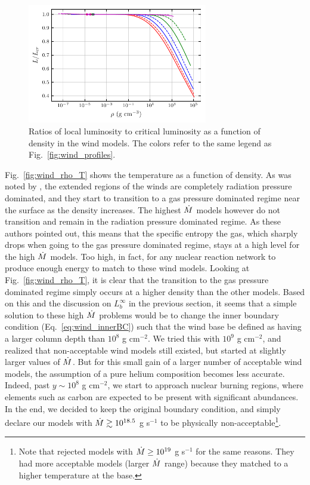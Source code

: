 \documentclass[../main.tex]{subfiles}
\begin{document}
\begin{figure}[htb!]
    \centering
    \includegraphics[width=0.7\textwidth]{figures/wind_L_Lcrit.pdf}
    \caption[Wind local to critical luminosity ratios]{Ratios of local luminosity to critical luminosity as a function of density in the wind models. The colors refer to the same legend as Fig.~\ref{fig:wind_profiles}.}
    \label{fig:wind_L_Lcrit}
\end{figure}

Fig.~\ref{fig:wind_rho_T} shows the temperature as a function of density. As was noted by \citet{Paczynski1986b}, the extended regions of the winds are completely radiation pressure dominated, and they start to transition to a gas pressure dominated regime near the surface as the density increases. The highest $\dot{M}$ models however do not transition and remain in the radiation pressure dominated regime. As these authors pointed out, this means that the specific entropy the gas, which sharply drops when going to the gas pressure dominated regime, stays at a high level for the high $\dot{M}$ models. Too high, in fact, for any nuclear reaction network to produce enough energy to match to these wind models. Looking at Fig.~\ref{fig:wind_rho_T}, it is clear that the transition to the gas pressure dominated regime simply occurs at a higher density than the other models. Based on this and the discussion on $L
_b^\infty$ in the previous section, it seems that a simple solution to these high $\dot{M}$ problems would be to change the inner boundary condition (Eq.~\ref{eq:wind_innerBC}) such that the wind base be defined as having a larger column depth than $10^8$ g cm$^{-2}$. We tried this with $10^9$ g cm$^{-2}$, and realized that non-acceptable wind models still existed, but started at slightly larger values of $\dot{M}$. But for this small gain of a larger number of acceptable wind models, the assumption of a pure helium composition becomes less accurate. Indeed, past $y\sim 10
^8$ g cm$^{-2}$, we start to approach nuclear burning regions, where elements such as carbon are expected to be present with significant abundances.  In the end, we decided to keep the original boundary condition, and simply declare our models with $\dot{M}\gtrsim 10^{18.5}$ g s$^{-1}$ to be physically non-acceptable\footnote{Note that \citet{Paczynski1986b} rejected models with $\dot{M}\geq 10^{19}$ g s$^{-1}$ for the same reasons. They had more acceptable models (larger $\dot{M}$ range) because they matched to a higher temperature at the base.}. 
\end{document}
